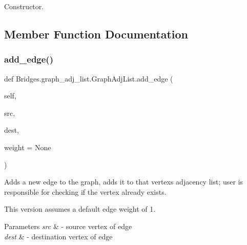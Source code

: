 Constructor. 



\subsection{Member Function Documentation}
\mbox{\label{class_bridges_1_1graph__adj__list_1_1_graph_adj_list_a6bbe6032852513b0dcc96c32ba9a38d5}} 
\subsubsection{\texorpdfstring{add\+\_\+edge()}{add\_edge()}}
{\footnotesize\ttfamily def Bridges.\+graph\+\_\+adj\+\_\+list.\+Graph\+Adj\+List.\+add\+\_\+edge (\begin{DoxyParamCaption}\item[{}]{self,  }\item[{}]{src,  }\item[{}]{dest,  }\item[{}]{weight = {\ttfamily None} }\end{DoxyParamCaption})}



Adds a new edge to the graph, adds it to that vertex\textquotesingle{}s adjacency list; user is responsible for checking if the vertex already exists. 

This version assumes a default edge weight of 1.


\begin{DoxyParams}{Parameters}
{\em src} & -\/ source vertex of edge \\
\hline
{\em dest} & -\/ destination vertex of edge \\
\hline
\end{DoxyParams}
\mbox{\label{class_bridges_1_1graph__adj__list_1_1_graph_adj_list_a93fa88e14042ecbf8bf57d4f5e072a72}} 

